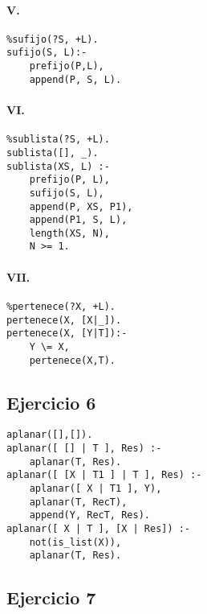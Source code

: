 \documentclass[10pt,a4paper]{article}
\begin{document}
\begin{multicols}{2}
\paragraph{V.}
\begin{centrado2}
\begin{verbatim}
%sufijo(?S, +L).
sufijo(S, L):-
    prefijo(P,L),
    append(P, S, L).
\end{verbatim}
\end{centrado2}

\paragraph{VI.}
\begin{centrado2}
\begin{verbatim}
%sublista(?S, +L).
sublista([], _).
sublista(XS, L) :-
    prefijo(P, L),
    sufijo(S, L),
    append(P, XS, P1),
    append(P1, S, L),
    length(XS, N),
    N >= 1.
\end{verbatim}
\end{centrado2}
\paragraph{VII.}
\begin{centrado2}
\begin{verbatim}
%pertenece(?X, +L).
pertenece(X, [X|_]).
pertenece(X, [Y|T]):-
    Y \= X,
    pertenece(X,T).
\end{verbatim}
\end{centrado2}
\end{multicols}

\subsection{Ejercicio 6}
\begin{centrado}
\begin{verbatim}
aplanar([],[]).
aplanar([ [] | T ], Res) :-
	aplanar(T, Res).
aplanar([ [X | T1 ] | T ], Res) :-
	aplanar([ X | T1 ], Y),
	aplanar(T, RecT),
	append(Y, RecT, Res).
aplanar([ X | T ], [X | Res]) :-
	not(is_list(X)),
	aplanar(T, Res).
\end{verbatim}
\end{centrado}

\newpage
\subsection{Ejercicio 7}
\end{document}
